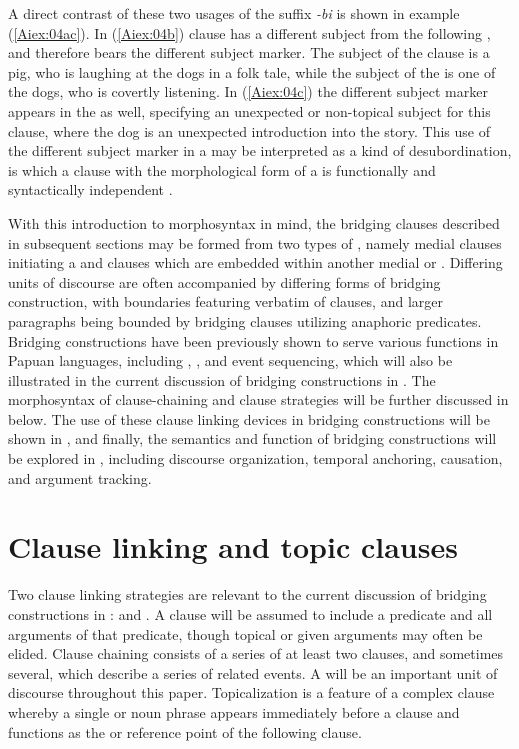 \documentclass[output=paper]{LSP/langsci}
\begin{document}
A direct contrast of these two usages of the suffix \textit{-bi} is shown in example (\ref{Aiex:04ac}). In (\ref{Aiex:04b})  clause has a different subject from the following , and therefore bears the different subject marker. The subject of the  clause is a pig, who is laughing at the dogs in a folk tale, while the subject of the  is one of the dogs, who is covertly listening. In (\ref{Aiex:04c}) the different subject marker appears in the  as well, specifying an unexpected or non-topical subject for this clause, where the dog is an unexpected introduction into the story. This use of the different subject marker in a  may be interpreted as a kind of desubordination, is which a clause with the morphological form of a  is functionally and syntactically independent \citep{evans07}.

With this introduction to  morphosyntax in mind, the bridging clauses described in
subsequent sections may be formed from two types of , namely medial clauses
initiating a  and  clauses which are embedded within another medial or .
Differing units of discourse are often accompanied by differing forms of bridging construction, with
 boundaries featuring verbatim  of clauses, and larger paragraphs being bounded
by bridging clauses utilizing anaphoric predicates. Bridging constructions have been previously shown to
serve various functions in Papuan languages, including , , and
event sequencing, which will also be illustrated in the current discussion of bridging constructions in
. The morphosyntax of clause-chaining and clause  strategies will be further
discussed in  below. The use of these clause linking devices in bridging constructions will be shown in
, and finally, the semantics and function of bridging constructions will be explored in , including
discourse organization, temporal anchoring, causation, and argument tracking.

\section{Clause linking and topic clauses} 
\label{Ailinkingtopic}
Two clause linking strategies are relevant to the current discussion of bridging constructions in
:  and . A clause will be assumed to include a predicate and all
arguments of that predicate, though topical or given arguments may often be elided. Clause chaining
consists of a series of at least two clauses, and sometimes several, which describe a series of related
events. A  will be an important unit of  discourse throughout this paper. Topicalization
is a feature of a complex clause whereby a single  or noun phrase appears immediately
before a clause and functions as the  or reference point of the following clause.
\end{document}
